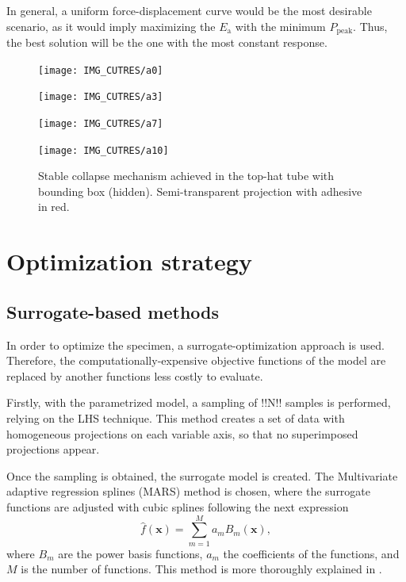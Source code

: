 \documentclass[cmfonts]{witpress}
\begin{document}
In general, a uniform force-displacement curve would be the most desirable scenario, as it would imply maximizing the $E_\text{a}$  with the minimum $P_\text{peak}$. Thus, the best solution will be the one with the most constant response.

\begin{figure}
	\centering
	\begin{minipage}[b]{.15\linewidth}
		\centering
		\texttt{[image: IMG\_CUTRES/a0]}
	\end{minipage}
	\hfill
	\begin{minipage}[b]{.15\linewidth}
		\centering
		\texttt{[image: IMG\_CUTRES/a3]}
	\end{minipage}
	\hfill
	\begin{minipage}[b]{.15\linewidth}
		\centering
		\texttt{[image: IMG\_CUTRES/a7]}
	\end{minipage}
	\hfill
	\begin{minipage}[b]{.15\linewidth}
		\centering
		\texttt{[image: IMG\_CUTRES/a10]}
	\end{minipage}
	\caption[Stable collapse mechanism achieved in the top-hat tube with bounding box.]{Stable collapse mechanism achieved in the top-hat tube with bounding box (hidden). Semi-transparent projection with adhesive in red.}
	\label{fig:stable}
\end{figure}

\section{Optimization strategy}

\subsection{Surrogate-based methods}

In order to optimize the specimen, a surrogate-optimization approach is used. Therefore, the computationally-expensive  objective functions of the model are replaced by another functions less costly to evaluate. 

Firstly, with the parametrized model, a sampling of !!N!! samples is performed, relying on the LHS technique. This method creates a set of data with homogeneous projections on each variable axis, so that no superimposed projections appear. 

Once the sampling is obtained, the surrogate model is created. The Multivariate adaptive regression splines (MARS) method is chosen, where the surrogate functions are adjusted with cubic splines following the next expression
\begin{equation}\label{eq:mars}
\hat{f}\left ( \bm{x} \right )= \sum_{m=1}^{M}a_{m}B_{m}\left ( \bm{x} \right ),
\end{equation}
where $B_{m}$ are the power basis functions, $a_{m}$ the coefficients of the functions, and $M$ is the number of functions. This method is more thoroughly explained in \cite{Friedman1995197}. 
\end{document}
